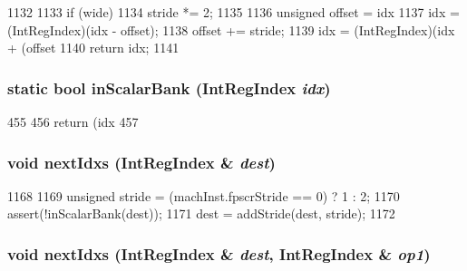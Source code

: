 \begin{DoxyCode}
1132 {
1133     if (wide) {
1134         stride *= 2;
1135     }
1136     unsigned offset = idx %
1137     idx = (IntRegIndex)(idx - offset);
1138     offset += stride;
1139     idx = (IntRegIndex)(idx + (offset %
1140     return idx;
1141 }
\end{DoxyCode}
\hypertarget{classArmISA_1_1VfpMacroOp_a0cbd00c4ea56d646aae899c4d0a60a38}{
\subsubsection[{inScalarBank}]{\setlength{\rightskip}{0pt plus 5cm}static bool inScalarBank ({\bf IntRegIndex} {\em idx})}}
\label{classArmISA_1_1VfpMacroOp_a0cbd00c4ea56d646aae899c4d0a60a38}



\begin{DoxyCode}
455     {
456         return (idx %
457     }
\end{DoxyCode}
\hypertarget{classArmISA_1_1VfpMacroOp_afc9b9d5a5b0758715df8dbe62c44be5a}{
\subsubsection[{nextIdxs}]{\setlength{\rightskip}{0pt plus 5cm}void nextIdxs ({\bf IntRegIndex} \& {\em dest})}}
\label{classArmISA_1_1VfpMacroOp_afc9b9d5a5b0758715df8dbe62c44be5a}



\begin{DoxyCode}
1168 {
1169     unsigned stride = (machInst.fpscrStride == 0) ? 1 : 2;
1170     assert(!inScalarBank(dest));
1171     dest = addStride(dest, stride);
1172 }
\end{DoxyCode}
\hypertarget{classArmISA_1_1VfpMacroOp_a6dd00740691349223310ace731189cb8}{
\subsubsection[{nextIdxs}]{\setlength{\rightskip}{0pt plus 5cm}void nextIdxs ({\bf IntRegIndex} \& {\em dest}, \/  {\bf IntRegIndex} \& {\em op1})}}
\label{classArmISA_1_1VfpMacroOp_a6dd00740691349223310ace731189cb8}



